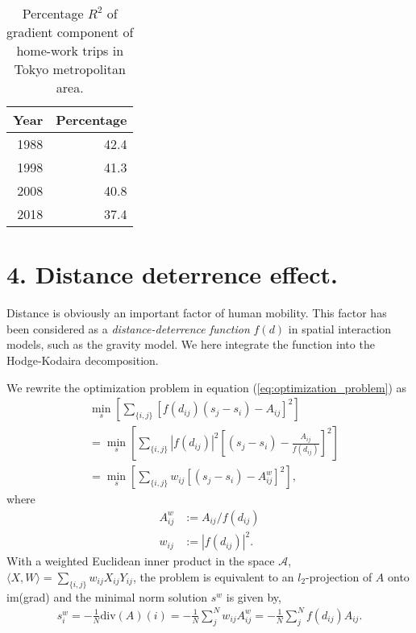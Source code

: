 \documentclass[]{article}
\begin{document}
%
%
%
\begin{table}[ht]
\centering
\begin{tabular}{rr}
  \toprule
Year & Percentage \\ 
  \midrule
1988 & 42.4 \\ 
  1998 & 41.3 \\ 
  2008 & 40.8 \\ 
  2018 & 37.4 \\ 
   \bottomrule
\end{tabular}
\caption{Percentage $R^2$ of gradient component of home-work trips in Tokyo metropolitan area.} 
\label{tbl:TokyoPercentage}
\end{table}

\section*{4. Distance deterrence effect.}
Distance is obviously an important factor of human mobility.
This factor has been considered as a \textit{distance-deterrence function} $f(d)$ in spatial interaction models, such as the gravity model.
We here integrate the function into the Hodge-Kodaira decomposition.

We rewrite the optimization problem in equation (\ref{eq:optimization_problem}) as
\begin{align}
  & \min_s \left[ \sum_{\{i,j\} } \left[ f(d_{ij})(s_j - s_i) - A_{ij} \right]^2 \right] \nonumber\\
  &  = 
  \min_s \left[ \sum_{\{i,j\} } |f(d_{ij})|^2 \left[ (s_j - s_i) - \frac{A_{ij} }{f (d_{ij})} \right]^2 \right] \nonumber \\
  &= 
  \min_s \left[ \sum_{\{i,j\} } w_{ij} \left[ (s_j - s_i) - A^w_{ij} \right]^2 \right],
\end{align}
where
\begin{align*}
  A^{w}_{ij} &:=  A_{ij} / f(d_{ij})\\
  w_{ij} &:= |f(d_{ij})|^2.
\end{align*}
With a weighted Euclidean inner product in the space $\mathcal{A}$,
$\langle X,W\rangle = \sum_{ \{i,j\} } w_{ij} X_{ij}Y_{ij}$,
the problem is equivalent to an $l_2$-projection of $A$ onto im(grad)
and the minimal norm solution $s^w$  is given by,
\begin{align}
  s^w_i = - \frac{1}{N} \text{div} (A)(i) 
  = - \frac{1}{N} \sum_j^N w_{ij} A^w_{ij}
  = - \frac{1}{N} \sum_j^N f(d_{ij}) A_{ij}. \label{eq:distance-integrated}
\end{align}
\end{document}

